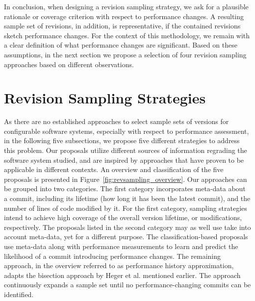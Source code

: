 In conclusion, when designing a revision sampling strategy, we ask for a
plausible rationale or coverage criterion with respect to performance changes.
A resulting sample set of revisions, in addition, is representative, if the
contained revisions sketch performance changes. For the context of this
methodology, we remain with a clear definition of what performance
changes are significant. Based on these assumptions, in the next section we
propose a selection of four revision sampling approaches based on different
observations.
 
\section{Revision Sampling Strategies}\label{sec:revsampling_strat}
As there are no established approaches to select sample sets of versions for
configurable software systems, especially with respect to performance
assessment, in the following five subsections, we propose five different
strategies to address this problem. Our proposals utilize different sources of
information regrading the software system studied, and are inspired by
approaches that have proven to be applicable in different contexts. An overview
and classification of the five proposals is presented in
Figure~\ref{fig:revsampling_overview}. 
Our approaches can be grouped into two categories. The first category incorporates
meta-data about a commit, including its lifetime (how long it has been the
latest commit), and the number of lines of code modified by it. For the first
category, sampling strategies intend to achieve high coverage of the overall
version lifetime, or modifications, respectively. The proposals listed in the
second category may as well use take into account meta-data, yet for a
different purpose. The classification-based proposals use meta-data along with
performance measurements to learn and predict the likelihood of a commit
introducing performance changes. The remaining approach, in the overview
referred to as performance history approximation, adapts the bisection approach
by Heger et al. mentioned earlier. The approach continuously expands a sample
set until no performance-changing commits can be identified.

